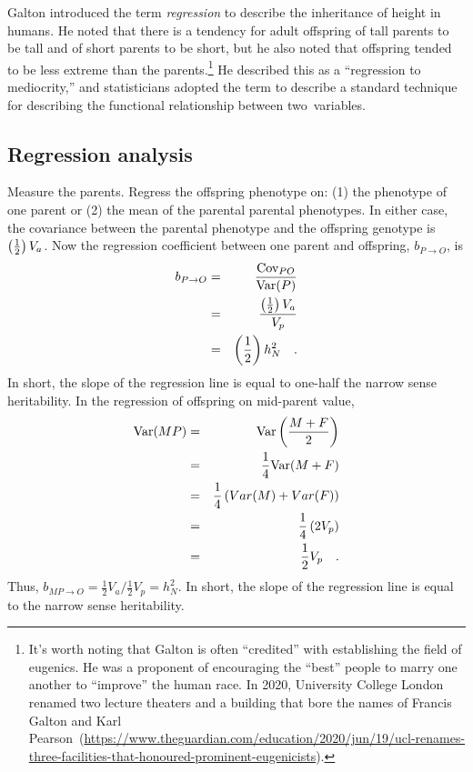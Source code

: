 \documentclass[12pt]{article}
\begin{document}
Galton introduced the term {\it regression\/} to describe the
inheritance of height in humans. He noted that there is a tendency for
adult offspring of tall parents to be tall and of short parents to be
short, but he also noted that offspring tended to be less extreme than
the parents.\footnote{It's worth noting that Galton is often
  ``credited'' with establishing the field of eugenics. He was a
  proponent of encouraging the ``best'' people to marry one another to
  ``improve'' the human race. In 2020, University College London
  renamed two lecture theaters and a building that bore the names of
  Francis Galton and Karl Pearson~(\url{https://www.theguardian.com/education/2020/jun/19/ucl-renames-three-facilities-that-honoured-prominent-eugenicists}).}
He described this as a ``regression to mediocrity,'' and statisticians
adopted the term to describe a standard technique for describing the
functional relationship between two~variables.

\subsection*{Regression analysis}

Measure the parents.  Regress the offspring phenotype on: (1) the
phenotype of one parent or (2) the mean of the parental parental
phenotypes.  In either case, the covariance between the parental
phenotype and the offspring genotype is $\left({1 \over 2}\right)V_a$.
Now the regression coefficient between one parent and offspring, $b_{P
\rightarrow O}$, is
\begin{eqnarray*}
b_{P \rightarrow O}
&=& \frac{\mbox{Cov}_{PO}}{\mbox{Var}(P)} \\
&=& {\left({1 \over 2}\right)V_a \over V_p} \\
&=& \left({1 \over 2}\right)h^2_N \quad .
\end{eqnarray*}
In short, the slope of the regression line is equal to one-half the
narrow sense heritability.  In the regression of offspring on
mid-parent value,
\begin{eqnarray*}
\mbox{Var}(MP) &=& \mbox{Var}\left(\frac{M+F}{2}\right) \\
                  &=& \frac{1}{4} \mbox{Var}(M+F) \\
                  &=& \frac{1}{4} \left(Var(M) + Var(F)\right) \\
                  &=& \frac{1}{4} \left(2V_p\right) \\
                  &=& \frac{1}{2} V_p \quad .
\end{eqnarray*}
Thus, $b_{MP \rightarrow O} = \frac{1}{2}V_a/\frac{1}{2}V_p = h^2_N$.
In short, the slope of the regression line is equal to the narrow
sense heritability.
\end{document}
